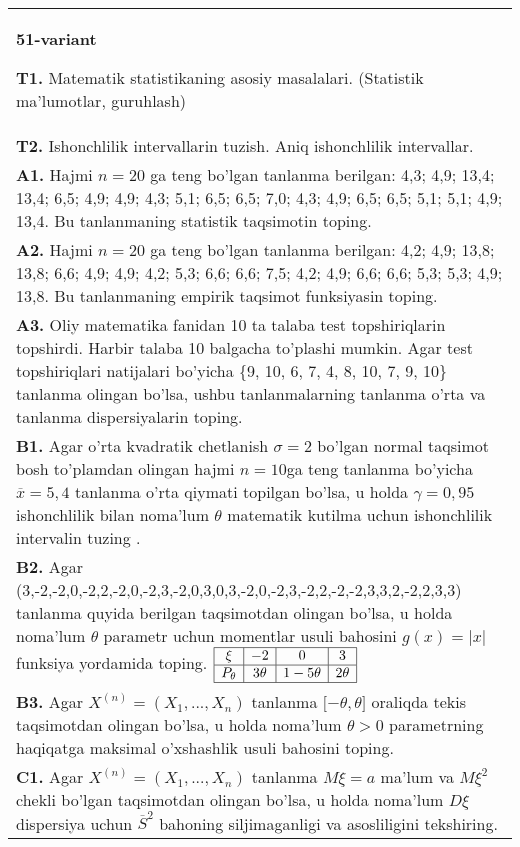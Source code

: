 \documentclass{article}
\begin{document}
\begin{tabular}{m{17cm}}
\textbf{51-variant}
\newline

\textbf{T1.} Matematik statistikaning asosiy masalalari. (Statistik ma'lumotlar, guruhlash)
\\
\textbf{T2.} 
Ishonchlilik intervallarin tuzish. Aniq ishonchlilik intervallar.
\\
\textbf{A1.} 
Hajmi \(n = 20\) ga teng bo'lgan tanlanma berilgan: 4,3; 4,9; 13,4; 13,4; 6,5; 4,9; 4,9; 4,3; 5,1; 6,5; 6,5; 7,0; 4,3; 4,9; 6,5; 6,5; 5,1; 5,1; 4,9; 13,4. Bu tanlanmaning statistik taqsimotin toping.
\\
\textbf{A2.} 
Hajmi \(n = 20\) ga teng bo'lgan tanlanma berilgan: 4,2; 4,9; 13,8; 13,8; 6,6; 4,9; 4,9; 4,2; 5,3; 6,6; 6,6; 7,5; 4,2; 4,9; 6,6; 6,6; 5,3; 5,3; 4,9; 13,8. Bu tanlanmaning empirik taqsimot funksiyasin toping.
\\
\textbf{A3.} 
Oliy matematika fanidan 10 ta talaba test topshiriqlarin topshirdi. Harbir talaba 10 balgacha to'plashi mumkin. Agar test topshiriqlari natijalari bo'yicha \{9, 10, 6, 7, 4, 8, 10, 7, 9, 10\} tanlanma olingan bo'lsa, ushbu tanlanmalarning tanlanma o'rta va tanlanma dispersiyalarin toping.
\\
\textbf{B1.} 
Agar o'rta kvadratik chetlanish \(\sigma = 2\) bo'lgan normal taqsimot bosh to'plamdan olingan hajmi \(n = 10\)ga teng tanlanma bo'yicha \(\overline{x} = 5,4\) tanlanma o'rta qiymati topilgan bo'lsa, u holda \(\gamma = 0,95\) ishonchlilik bilan noma'lum \(\theta\) matematik kutilma uchun ishonchlilik intervalin tuzing .
\\
\textbf{B2.} 
Agar (3,-2,-2,0,-2,2,-2,0,-2,3,-2,0,3,0,3,-2,0,-2,3,-2,2,-2,-2,3,3,2,-2,2,3,3) tanlanma quyida berilgan taqsimotdan olingan bo'lsa, u holda noma'lum \(\theta\) parametr uchun momentlar usuli bahosini \(g(x) = |x|\) funksiya yordamida toping.
$\begin{array}{|c|c|c|c|}
    \hline
    \xi & -2 & 0 & 3 \\
    \hline
    P_{\theta} & 3\theta & 1 - 5\theta & 2\theta \\
    \hline
\end{array}$
\\
\textbf{B3.} 
Agar \(X^{(n)} = \left( X_{1},...,X_{n} \right)\) tanlanma \(\lbrack - \theta,\theta\rbrack\) oraliqda tekis taqsimotdan olingan bo'lsa, u holda noma'lum \(\theta > 0\) parametrning haqiqatga maksimal o'xshashlik usuli bahosini toping.
\\
\textbf{C1.} 
Agar \(X^{(n)} = \left( X_{1},...,X_{n} \right)\) tanlanma \(M\xi = a\) ma'lum va \(M\xi^{2}\) chekli bo'lgan taqsimotdan olingan bo'lsa, u holda noma'lum \(D\xi\) dispersiya uchun \({\overline{S}}^{2}\) bahoning siljimaganligi va asosliligini tekshiring.

\end{tabular}
\end{document}
